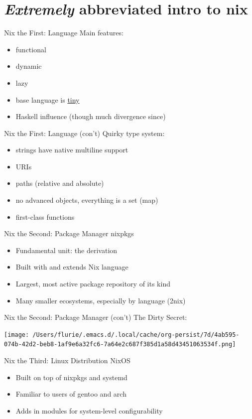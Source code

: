 \documentclass[bigger]{beamer}
\begin{document}
\section{\emph{Extremely} abbreviated intro to nix}
\label{sec:orgbdfe28d}
\begin{frame}[label={sec:org543f6c4}]{Nix the First: Language}
Main features:
\begin{itemize}
\item functional
\item dynamic
\item lazy
\item base language is \uline{tiny}
\item Haskell influence (though much divergence since)
\end{itemize}
\end{frame}
\begin{frame}[label={sec:org44d97cf}]{Nix the First: Language (con't)}
Quirky type system:
\begin{itemize}
\item strings have native multiline support
\item URIs
\item paths (relative and absolute)
\item no advanced objects, everything is a set (map)
\item first-class functions
\end{itemize}
\end{frame}
\begin{frame}[label={sec:orgbbc45e5}]{Nix the Second: Package Manager}
nixpkgs
\begin{itemize}
\item Fundamental unit: the derivation
\item Built with and extends Nix language
\item Largest, most active package repository of its kind
\item Many smaller ecosystems, especially by language (2nix)
\end{itemize}
\end{frame}
\begin{frame}[label={sec:org28569cb}]{Nix the Second: Package Manager (con't)}
The Dirty Secret:
\begin{center}
\texttt{[image: /Users/flurie/.emacs.d/.local/cache/org-persist/7d/4ab595-074b-42d2-beb8-1af9e6a32fc6-7a64e2c687f385d1a58d43451063534f.png]}
\end{center}
\end{frame}
\begin{frame}[label={sec:orga8e71c0}]{Nix the Third: Linux Distribution}
NixOS
\begin{itemize}
\item Built on top of nixpkgs and systemd
\item Familiar to users of gentoo and arch
\item Adds in modules for system-level configurability
\end{itemize}
\end{frame}
\end{document}
